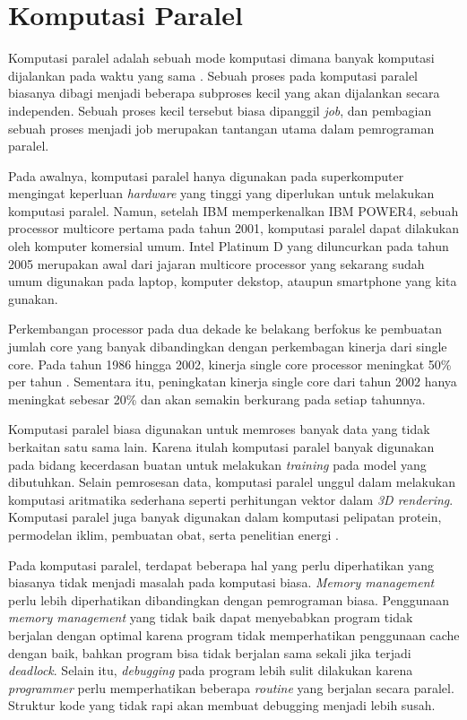\section{Komputasi Paralel}
Komputasi paralel adalah sebuah mode komputasi dimana banyak komputasi dijalankan pada waktu yang sama \citep{highly_parallel_computing}. Sebuah proses pada komputasi paralel biasanya dibagi menjadi beberapa subproses kecil yang akan dijalankan secara independen. Sebuah proses kecil tersebut biasa dipanggil \textit{job}, dan pembagian sebuah proses menjadi job merupakan tantangan utama dalam pemrograman paralel.

Pada awalnya, komputasi paralel hanya digunakan pada superkomputer mengingat keperluan \textit{hardware} yang tinggi yang diperlukan untuk melakukan komputasi paralel. Namun, setelah IBM memperkenalkan IBM POWER4, sebuah processor multicore pertama pada tahun 2001, komputasi paralel dapat dilakukan oleh komputer komersial umum. Intel Platinum D yang diluncurkan pada tahun 2005 merupakan awal dari jajaran multicore processor yang sekarang sudah umum digunakan pada laptop, komputer dekstop, ataupun smartphone yang kita gunakan. 

Perkembangan processor pada dua dekade ke belakang berfokus ke pembuatan jumlah core yang banyak dibandingkan dengan perkembagan kinerja dari single core. Pada tahun 1986 hingga 2002, kinerja single core processor meningkat 50\% per tahun \citep{comp_arch_patterson}. Sementara itu, peningkatan kinerja single core dari tahun 2002 hanya meningkat sebesar 20\% \citep{intro_parallel} dan akan semakin berkurang pada setiap tahunnya. 

Komputasi paralel biasa digunakan untuk memroses banyak data yang tidak berkaitan satu sama lain. Karena itulah komputasi paralel banyak digunakan pada bidang kecerdasan buatan untuk melakukan \textit{training} pada model yang dibutuhkan. Selain pemrosesan data, komputasi paralel unggul dalam melakukan komputasi aritmatika sederhana seperti perhitungan vektor dalam \textit{3D rendering}. Komputasi paralel juga banyak digunakan dalam komputasi pelipatan protein, permodelan iklim, pembuatan obat, serta penelitian energi \citep{intro_parallel}. 

Pada komputasi paralel, terdapat beberapa hal yang perlu diperhatikan yang biasanya tidak menjadi masalah pada komputasi biasa. \textit{Memory management} perlu lebih diperhatikan dibandingkan dengan pemrograman biasa. Penggunaan \textit{memory management} yang tidak baik dapat menyebabkan program tidak berjalan dengan optimal karena program tidak memperhatikan penggunaan cache dengan baik, bahkan program bisa tidak berjalan sama sekali jika terjadi \textit{deadlock}. Selain itu, \textit{debugging} pada program lebih sulit dilakukan karena \textit{programmer} perlu memperhatikan beberapa \textit{routine} yang berjalan secara paralel. Struktur kode yang tidak rapi akan membuat debugging menjadi lebih susah.


